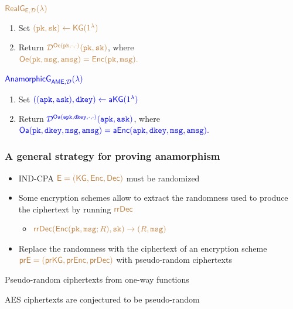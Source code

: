 \documentclass[]{beamer}
\begin{document}
\begin{frame}


\begin{center}
\begin{boxedminipage}[t]{12cm}
$\color{brown} {\mathsf{RealG}}_{{\mathsf{E}},\mathcal{D}}(\lambda)$
\begin{enumerate}
\item Set $\color{brown} ({\mathtt{pk}},{\mathtt{sk}})\leftarrow{\mathsf{KG}}(1^\lambda)$
\item Return $\color{brown} \mathcal{D}^{{\mathsf{Oe}}({\mathtt{pk}},\cdot,\cdot)}({\mathtt{pk}},{\mathtt{sk}})$,
where
\\
$\color{brown} {\mathsf{Oe}}({\mathtt{pk}},{\mathtt{msg}},{\mathtt{a}}{\mathtt{msg}})={\mathsf{Enc}}({\mathtt{pk}},{\mathtt{msg}}).$
\end{enumerate}
\end{boxedminipage}
\vfill
\begin{boxedminipage}[t]{12cm}
$\color{blue} {\mathsf{AnamorphicG}}_{{\mathsf{AME}},\mathcal{D}}(\lambda)$
\begin{enumerate}
\item Set $\color{blue} (({\mathtt{a}}{\mathtt{pk}},{\mathtt{a}}{\mathtt{sk}}),{\mathtt{dkey}})\leftarrow{\mathsf{a}}{\mathsf{KG}}(1^\lambda)$
\item Return $\color{blue} \mathcal{D}^{{\mathsf{Oa}}({\mathtt{a}}{\mathtt{pk}},{\mathtt{dkey}},\cdot,\cdot)}({\mathtt{a}}{\mathtt{pk}},{\mathtt{a}}{\mathtt{sk}})$,
where\\
$\color{blue} {\mathsf{Oa}}({\mathtt{pk}},{\mathtt{dkey}},{\mathtt{msg}},{\mathtt{a}}{\mathtt{msg}})={\mathsf{a}}{\mathsf{Enc}}({\mathtt{a}}{\mathtt{pk}},{\mathtt{dkey}},{\mathtt{msg}},{\mathtt{a}}{\mathtt{msg}}).$
\end{enumerate}
\end{boxedminipage}
\end{center}
\end{frame}

                           
\begin{frame}
\frametitle{A general strategy for proving anamorphism}

\begin{itemize}
\item IND-CPA $\color{brown} {\mathsf{E}}=({\mathsf{KG}},{\mathsf{Enc}},{\mathsf{Dec}})$ must be randomized
\item Some encryption schemes allow to extract the randomness used
to produce the ciphertext by running $\color{brown} {\mathsf{rr}}{\mathsf{Dec}}$
    \begin{itemize}
        \item $\color{brown}{\mathsf{rr}}{\mathsf{Dec}}({\mathsf{Enc}}({\mathtt{pk}},{\mathtt{msg}};R),{\mathtt{sk}})\rightarrow(R,{\mathtt{msg}})$
    \end{itemize}
\item Replace the randomness with the ciphertext of an encryption scheme
$\color{brown} {\mathsf{pr}}{\mathsf{E}}=({\mathsf{pr}}{\mathsf{KG}},{\mathsf{pr}}{\mathsf{Enc}},{\mathsf{pr}}{\mathsf{Dec}})$ with pseudo-random ciphertexts
\end{itemize}

\vfill

\color{teal}
Pseudo-random ciphertexts from one-way functions

AES ciphertexts are conjectured to be pseudo-random
\end{frame}
\end{document}
